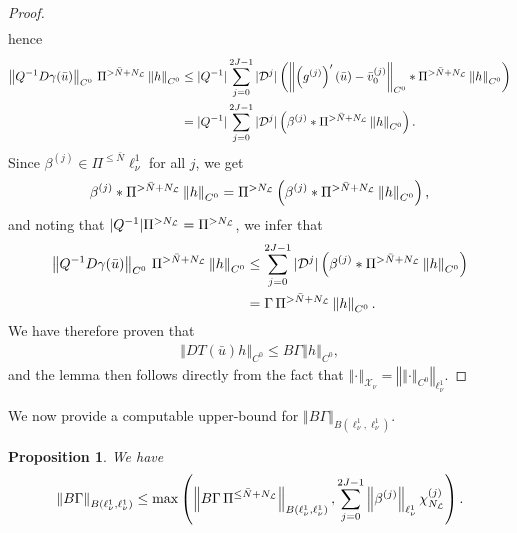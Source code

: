\documentclass[10pt,a4paper]{article}
\theoremstyle{plain}
\newtheorem{proposition}[theorem]{Proposition}
\renewcommand{\L}{\mathcal{L}}
\newcommand{\D}{\mathcal{D}}
\newcommand{\X}{\mathcal{X}}
\newcommand{\bu}{\bar{u}}
\newcommand{\bN}{\bar{N}}
\newcommand{\1}{\mathbf{1}}
\newcommand{\NL}{N_{\text{\tiny{$\L$}}}}
\begin{document}
\begin{proof}
\begin{align*}
\end{align*}
hence
\begin{align*}
\left\Vert Q^{-1}D\gamma(\bu)\right\Vert_{C^0}\, \Pi^{> \bN + \NL} \left\Vert h\right\Vert_{C^0} & \leq \vert Q^{-1}\vert \sum_{j=0}^{2J-1} \vert\D^j\vert \left(\left\Vert\left(g^{(j)}\right)'(\bu) - \bar{v}^{(j)}_0 \right\Vert_{C^0} \ast \Pi^{> \bN + \NL} \left\Vert h\right\Vert_{C^0} \right) \\
& = \vert Q^{-1}\vert \sum_{j=0}^{2J-1} \vert\D^j\vert \left(\beta^{(j)} \ast \Pi^{> \bN + \NL} \left\Vert h\right\Vert_{C^0} \right).
\end{align*}
Since $\beta^{(j)} \in\Pi^{\leq \bN}\ell^1_\nu$ for all $j$, we get
\begin{align*}
\beta^{(j)} \ast \Pi^{> \bN + \NL} \left\Vert h\right\Vert_{C^0} = \Pi^{>\NL} \left(\beta^{(j)} \ast \Pi^{> \bN + \NL} \left\Vert h\right\Vert_{C^0}\right),
\end{align*}
and noting that $\vert Q^{-1}\vert \Pi^{>\NL} = \Pi^{>\NL}$, we infer that
\begin{align*}
\left\Vert Q^{-1}D\gamma(\bu)\right\Vert_{C^0}\, \Pi^{> \bN + \NL} \left\Vert h\right\Vert_{C^0} & \leq \sum_{j=0}^{2J-1} \vert\D^j\vert \left(\beta^{(j)} \ast \Pi^{> \bN + \NL} \left\Vert h\right\Vert_{C^0} \right)\\
& = \Gamma\, \Pi^{> \bN + \NL} \left\Vert h\right\Vert_{C^0}.
\end{align*}
We have therefore proven that
\begin{align*}
\left\Vert DT(\bu)h \right\Vert_{C^0} \leq B\Gamma \left\Vert h \right\Vert_{C^0},
\end{align*}
and the lemma then follows directly from the fact that $\left\Vert \cdot \right\Vert_{\X_\nu} = \left\Vert \left\Vert \cdot \right\Vert_{C^0} \right\Vert_{\ell^1_\nu}$.
\end{proof}
%
We now provide a computable upper-bound for $\left\Vert B\Gamma \right\Vert_{B(\ell^1_\nu,\ell^1_\nu)}$.
\begin{proposition}
\label{prop:ell1forZ}
We have
\begin{align*}
\left\Vert B\Gamma \right\Vert_{B(\ell^1_\nu,\ell^1_\nu)} \leq \max\left( \left\Vert B\Gamma \, \Pi^{\leq \bN+\NL} \right\Vert_{B(\ell^1_\nu,\ell^1_\nu)}, \sum_{j=0}^{2J-1} \left\Vert \beta^{(j)}\right\Vert_{\ell^1_\nu} \chi^{(j)}_{\NL}\right).
\end{align*}
\end{proposition}
%
\end{document}
